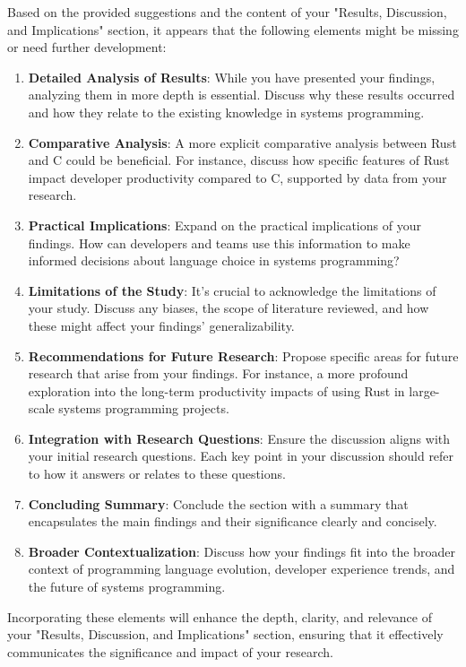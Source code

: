 \documentclass[conference]{IEEEtran}
\begin{document}
{\color{red}
    Based on the provided suggestions and the content of your "Results, Discussion, and Implications" section, it appears that the following elements might be missing or need further development:
    \begin{enumerate}
        \item\textbf{Detailed Analysis of Results}: While you have presented your findings, analyzing them in more depth is essential. Discuss why these results occurred and how they relate to the existing knowledge in systems programming.
        \item\textbf{Comparative Analysis}: A more explicit comparative analysis between Rust and C could be beneficial. For instance, discuss how specific features of Rust impact developer productivity compared to C, supported by data from your research.
        \item\textbf{Practical Implications}: Expand on the practical implications of your findings. How can developers and teams use this information to make informed decisions about language choice in systems programming?
        \item\textbf{Limitations of the Study}: It's crucial to acknowledge the limitations of your study. Discuss any biases, the scope of literature reviewed, and how these might affect your findings' generalizability.
        \item\textbf{Recommendations for Future Research}: Propose specific areas for future research that arise from your findings. For instance, a more profound exploration into the long-term productivity impacts of using Rust in large-scale systems programming projects.
        \item\textbf{Integration with Research Questions}: Ensure the discussion aligns with your initial research questions. Each key point in your discussion should refer to how it answers or relates to these questions.
        \item\textbf{Concluding Summary}: Conclude the section with a summary that encapsulates the main findings and their significance clearly and concisely.
        \item\textbf{Broader Contextualization}: Discuss how your findings fit into the broader context of programming language evolution, developer experience trends, and the future of systems programming.
    \end{enumerate}

    Incorporating these elements will enhance the depth, clarity, and relevance of your "Results, Discussion, and Implications" section, ensuring that it effectively communicates the significance and impact of your research.}
\end{document}
